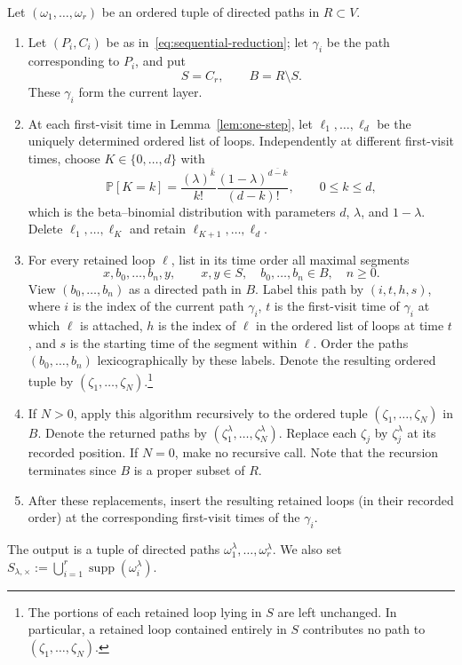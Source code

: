 \documentclass[10pt,a4paper]{amsart}
\newcommand{\Prob}{\mathbb P}
\newcommand{\supp}{\operatorname{supp}}
\begin{document}
\begin{algorithm}[Construction]
\label{alg:time-catcher} Let $(\omega_1,\ldots,\omega_r)$ be an ordered tuple of directed paths in $R\subset V$.

\begin{enumerate}[label=\textup{(\arabic*)},leftmargin=2.4em]
\item Let $(P_i,C_i)$ be as in~\eqref{eq:sequential-reduction}; let $\gamma_i$
be the path corresponding to $P_i$, and put
\[
 S=C_r,\qquad B=R\setminus S.
\]
These $\gamma_i$ form the current layer.\label{alg:1}

\item At each first-visit time in Lemma~\ref{lem:one-step}, let
$\ell_1,\ldots,\ell_d$ be the uniquely determined ordered list of loops.  Independently
at different first-visit times, choose $K\in\{0,\ldots,d\}$ with
\begin{equation}\label{eq:initial-block-law}
 \Prob[K=k]
 =\frac{(\lambda)^{\overline k}}{k!}
  \frac{(1-\lambda)^{\overline{d-k}}}{(d-k)!},
 \qquad 0\le k\le d,
\end{equation}
which is the beta--binomial distribution with parameters $d$, $\lambda$, and $1-\lambda$.
Delete $\ell_1,\ldots,\ell_K$ and retain
$\ell_{K+1},\ldots,\ell_d$.\label{alg:2}

\item For every retained loop $\ell$, list in its time order all maximal
segments
\[
 x,b_0,\ldots,b_n,y,
 \qquad x,y\in S,\quad b_0,\ldots,b_n\in B,\quad n\ge0.
\]
View $(b_0,\ldots,b_n)$ as a directed path in $B$. Label
this path by $(i,t,h,s)$, where $i$ is the index of the current path
$\gamma_i$, $t$ is the first-visit time of $\gamma_i$ at which $\ell$ is
attached, $h$ is the index of $\ell$ in the ordered list of loops at time $t$, and $s$ is the starting time of the segment within $\ell$. Order the paths $(b_0,\ldots,b_n)$ lexicographically by these
labels. Denote the resulting ordered tuple by
$(\zeta_1,\ldots,\zeta_N)$.\footnote{The portions of each retained loop lying in $S$ are left unchanged. In particular, a retained loop contained entirely in $S$ contributes no path to $(\zeta_1,\ldots,\zeta_N)$.}\label{alg:3}

\item If $N>0$, apply this algorithm recursively to the ordered
tuple $(\zeta_1,\ldots,\zeta_N)$ in $B$.  Denote the returned paths by
$(\zeta_1^\lambda,\ldots,\zeta_N^\lambda)$.  Replace each $\zeta_j$ by
$\zeta_j^\lambda$ at its recorded position.  If $N=0$, make no recursive
call. Note that the recursion terminates since $B$ is a proper subset of $R$.

\item After these replacements, insert the resulting retained loops (in their recorded order) at the corresponding first-visit times of the
$\gamma_i$.
\end{enumerate}

The output is a tuple of directed paths
$\omega_1^\lambda,\ldots,\omega_r^\lambda$. We also set $S_{\lambda,\times}:=\bigcup_{i=1}^r\supp(\omega_i^\lambda)$.
\end{algorithm}
\end{document}
